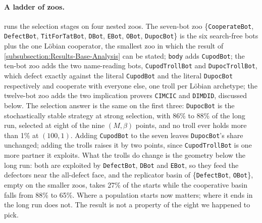 \paragraph{A ladder of zoos.}  runs the selection stages on four nested zoos. The seven-bot zoo \{\texttt{CooperateBot}, \texttt{DefectBot}, \texttt{TitForTatBot}, \texttt{DBot}, \texttt{EBot}, \texttt{OBot}, \texttt{DupocBot}\} is the six search-free bots plus the one Löbian cooperator, the smallest zoo in which the result of \cref{subsubsection:Results-Base-Analysis} can be stated; \texttt{body} adds \texttt{CupodBot}; the ten-bot zoo adds the two name-reading bots, \texttt{CupodTrollBot} and \texttt{DupocTrollBot}, which defect exactly against the literal \texttt{CupodBot} and the literal \texttt{DupocBot} respectively and cooperate with everyone else, one troll per Löbian archetype; the twelve-bot zoo adds the two implication provers \texttt{CIMCIC} and \texttt{DIMDID}, discussed below. The selection answer is the same on the first three: \texttt{DupocBot} is the stochastically stable strategy at strong selection, with 86\% to 88\% of the long run, selected at eight of the nine $(M,\beta)$ points, and no troll ever holds more than 1\% at $(100, 1)$. Adding \texttt{CupodBot} to the seven leaves \texttt{DupocBot}'s share unchanged; adding the trolls raises it by two points, since \texttt{CupodTrollBot} is one more partner it exploits. What the trolls do change is the geometry below the long run: both are exploited by \texttt{DefectBot}, \texttt{DBot} and \texttt{EBot}, so they feed the defectors near the all-defect face, and the replicator basin of \{\texttt{DefectBot}, \texttt{OBot}\}, empty on the smaller zoos, takes 27\% of the starts while the cooperative basin falls from 88\% to 65\%. Where a population starts now matters; where it ends in the long run does not. The result is not a property of the eight we happened to pick.

